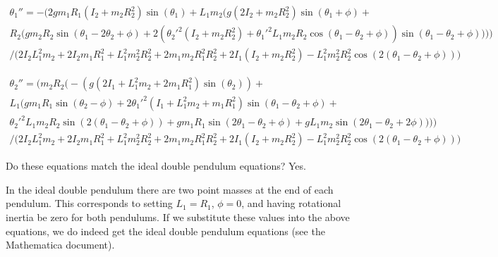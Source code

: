 \documentclass[draft]{article}
\begin{document}
\small
\begin{multline}
\theta_1'' = -\Big(2 g m_1 R_1 (I_2 + m_2 R_2^2) \sin(\theta_1) + L_1 m_2 \Big(g (2 I_2 + m_2 R_2^2) \sin(\theta_1 + \phi) + \\
R_2 \Big(g m_2 R_2 \sin(\theta_1 - 2 \theta_2 + \phi) + 2 (\theta_2'^2 (I_2 + m_2 R_2^2) +
\theta_1'^2 L_1 m_2 R_2 \cos(\theta_1 - \theta_2 + \phi)) \sin(\theta_1 - \theta_2 + \phi)
\Big)\Big)\Big)\\
\Big/
\Big(2 I_2 L_1^2 m_2 + 2 I_2 m_1 R_1^2 + 
L_1^2 m_2^2 R_2^2 + 2 m_1 m_2 R_1^2 R_2^2 + 2 I_1 (I_2 + m_2 R_2^2) - 
L_1^2 m_2^2 R_2^2 \cos(2 (\theta_1 - \theta_2 + \phi))\Big) 
\end{multline}

\begin{multline}
\theta_2'' = \Big(m_2 R_2 \Big(-(g (2 I_1 + L_1^2 m_2 + 2 m_1 R_1^2) \sin(\theta_2)) + \\
L_1 \Big(g m_1 R_1 \sin(\theta_2 - \phi) + 2 \theta_1'^2 (I_1 + L_1^2 m_2 + m_1 R_1^2) \sin(\theta_1 - \theta_2 + \phi) + \\
\theta_2'^2 L_1 m_2 R_2 \sin(2 (\theta_1 - \theta_2 + \phi)) + g m_1 R_1 \sin(2 \theta_1 - \theta_2 + \phi) + 
g L_1 m_2 \sin(2 \theta_1 - \theta_2 + 2 \phi)\Big)\Big)\Big)\\
\Big/
\Big(2 I_2 L_1^2 m_2 + 2 I_2 m_1 R_1^2 + L_1^2 m_2^2 R_2^2 + 
2 m_1 m_2 R_1^2 R_2^2 + 2 I_1 (I_2 + m_2 R_2^2) - L_1^2 m_2^2 R_2^2 \cos(2 (\theta_1 - \theta_2 + \phi))\Big)
\end{multline}

Do these equations match the ideal double pendulum equations? Yes.

In the ideal double pendulum there are two point masses at the end of each pendulum.  This corresponds to setting $L_1=R_1$, $\phi=0$, and having rotational inertia be zero for both pendulums.  If we substitute these values into the above equations, we do indeed get the ideal double pendulum equations (see the Mathematica document).
\end{document}
